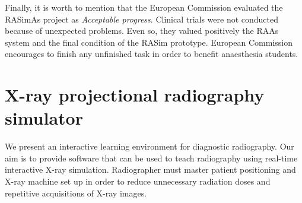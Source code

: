 
Finally, it is worth to mention that the European Commission evaluated the \acs{RASimAs} project as \emph{Acceptable progress}. Clinical trials were not conducted because of unexpected problems. Even so, they valued positively the \acs{RAAs} system and the final condition of the \acs{RASim} prototype. European Commission encourages to finish any unfinished task in order to benefit anaesthesia students.


\section{X-ray projectional radiography simulator }
\label{conclu:xray}

We present an interactive learning environment for diagnostic radiography. Our aim is to provide software that can be used to teach radiography using real-time interactive X-ray simulation. Radiographer must master patient positioning and X-ray machine set up in order to reduce unnecessary radiation doses and repetitive acquisitions of X-ray images.

